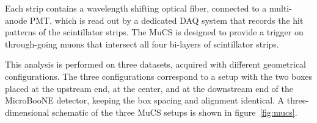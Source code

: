 \documentclass[a4paper,11pt]{article}
\begin{document}
Each strip contains a wavelength shifting optical fiber, connected to a multi-anode PMT, which is read out by a dedicated DAQ system that records the hit patterns of the scintillator strips.
The MuCS is designed to provide a trigger on through-going muons that intersect all four bi-layers of scintillator strips.

This analysis is performed on three datasets, acquired with different geometrical configurations. The three configurations correspond to a setup with the two boxes placed at the upstream end, at the center, and at the downstream end of the MicroBooNE detector, keeping the box spacing and alignment identical.
A three-dimensional schematic of the three MuCS setups is shown in figure~\ref{fig:mucs}.
\end{document}
